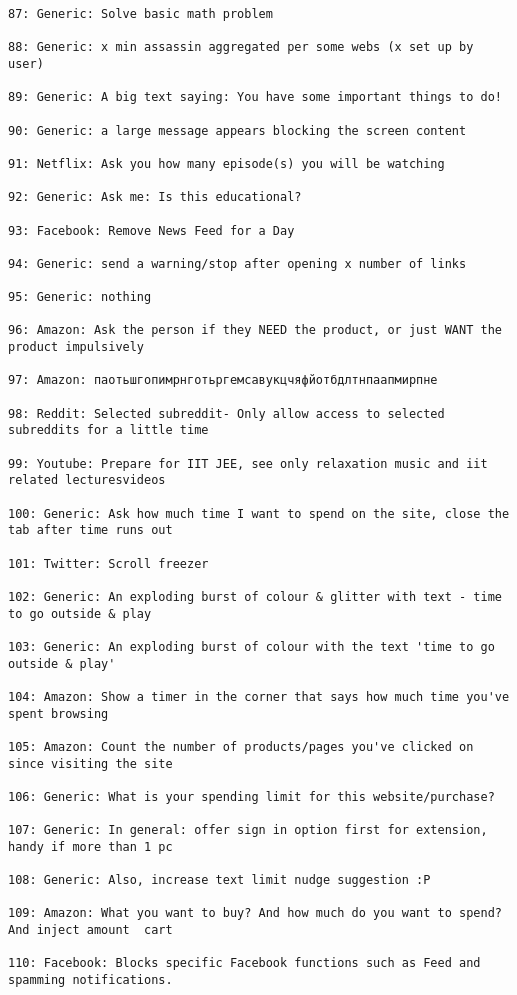 \begin{lstlisting}[breaklines]
87: Generic: Solve basic math problem

88: Generic: x min assassin aggregated per some webs (x set up by user)

89: Generic: A big text saying: You have some important things to do!

90: Generic: a large message appears blocking the screen content

91: Netflix: Ask you how many episode(s) you will be watching

92: Generic: Ask me: Is this educational?

93: Facebook: Remove News Feed for a Day

94: Generic: send a warning/stop after opening x number of links

95: Generic: nothing

96: Amazon: Ask the person if they NEED the product, or just WANT the product impulsively

97: Amazon: паотьшгопимрнготьргемсавукцчяфйотбдлтнпаапмирпне

98: Reddit: Selected subreddit- Only allow access to selected subreddits for a little time

99: Youtube: Prepare for IIT JEE, see only relaxation music and iit related lecturesvideos

100: Generic: Ask how much time I want to spend on the site, close the tab after time runs out

101: Twitter: Scroll freezer

102: Generic: An exploding burst of colour & glitter with text - time to go outside & play

103: Generic: An exploding burst of colour with the text 'time to go outside & play'

104: Amazon: Show a timer in the corner that says how much time you've spent browsing

105: Amazon: Count the number of products/pages you've clicked on since visiting the site

106: Generic: What is your spending limit for this website/purchase?

107: Generic: In general: offer sign in option first for extension, handy if more than 1 pc

108: Generic: Also, increase text limit nudge suggestion :P

109: Amazon: What you want to buy? And how much do you want to spend? And inject amount  cart

110: Facebook: Blocks specific Facebook functions such as Feed and spamming notifications.


\end{lstlisting}
